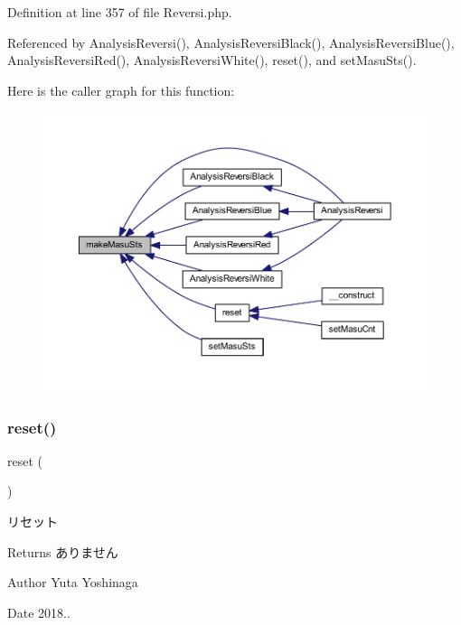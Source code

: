Definition at line 357 of file Reversi.\+php.



Referenced by Analysis\+Reversi(), Analysis\+Reversi\+Black(), Analysis\+Reversi\+Blue(), Analysis\+Reversi\+Red(), Analysis\+Reversi\+White(), reset(), and set\+Masu\+Sts().

Here is the caller graph for this function\+:
\nopagebreak
\begin{figure}[H]
\begin{center}
\leavevmode
\includegraphics[width=350pt]{class_reversi_a88869682786bb7c45c3488113deaa789_icgraph}
\end{center}
\end{figure}
\mbox{\label{class_reversi_a4a20559544fdf4dcb457e258dc976cf8}} 
\subsubsection{\texorpdfstring{reset()}{reset()}}
{\footnotesize\ttfamily reset (\begin{DoxyParamCaption}{ }\end{DoxyParamCaption})}



リセット 

\begin{DoxyReturn}{Returns}
ありません 
\end{DoxyReturn}
\begin{DoxyAuthor}{Author}
Yuta Yoshinaga 
\end{DoxyAuthor}
\begin{DoxyDate}{Date}
2018.. 
\end{DoxyDate}


